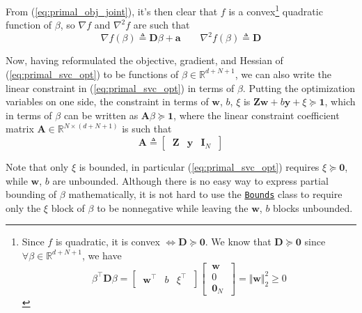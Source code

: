 \documentclass{article}
\numberwithin{equation}{section}
\newcommand{\Bounds}{%
    \href{%
        https://docs.scipy.org/doc/scipy/reference/generated/%
        scipy.optimize.Bounds.html%
    }{\texttt{Bounds}}%
}
\begin{document}
From (\ref{eq:primal_obj_joint}), it's then clear that $ f $ is a
convex\footnote{
    Since $ f $ is quadratic, it is convex $ \Leftrightarrow \mathbf{D}
    \succeq \mathbf{0} $. We know that $ \mathbf{D} \succeq \mathbf{0} $ since
    $ \forall \beta \in \mathbb{R}^{d + N + 1} $, we have
	\begin{equation*}
	    \beta^\top\mathbf{D}\beta = \begin{bmatrix}
	        \ \mathbf{w}^\top & b & \xi^\top \    
	    \end{bmatrix}\begin{bmatrix}
	        \ \mathbf{w} \ \\ \ 0 \ \\ \ \mathbf{0}_N \
	    \end{bmatrix} = \Vert\mathbf{w}\Vert_2^2 \ge 0
	\end{equation*}
} quadratic function of $ \beta $, so $ \nabla f $ and $ \nabla^2 f $ are
such that
\begin{equation} \label{eq:primal_grad_hess_joint}
    \nabla f(\beta) \triangleq \mathbf{D}\beta + \mathbf{a} \quad\quad
    \nabla^2f(\beta) \triangleq \mathbf{D}
\end{equation}

Now, having reformulated the objective, gradient, and Hessian of
(\ref{eq:primal_svc_opt}) to be functions of $ \beta \in
\mathbb{R}^{d + N + 1} $, we can also write the linear constraint in
(\ref{eq:primal_svc_opt}) in terms of $ \beta $. Putting the optimization
variables on one side, the constraint in terms of $ \mathbf{w} $, $ b $,
$ \xi $ is $ \mathbf{Zw} + b\mathbf{y} + \xi \succeq \mathbf{1} $, which in
terms of $ \beta $ can be written as $ \mathbf{A}\beta \succeq \mathbf{1} $,
where the linear constraint coefficient matrix $ \mathbf{A} \in
\mathbb{R}^{N \times (d + N + 1)} $ is such that
\begin{equation} \label{eq:primal_cons_mat_joint}
    \mathbf{A} \triangleq \begin{bmatrix}
        \ \mathbf{Z} & \mathbf{y} & \mathbf{I}_N \
    \end{bmatrix}
\end{equation}

Note that only $ \xi $ is bounded, in particular (\ref{eq:primal_svc_opt})
requires $ \xi \succeq \mathbf{0} $, while $ \mathbf{w} $, $ b $ are unbounded.
Although there is no easy way to express partial bounding of $ \beta $
mathematically, it is not hard to use the \Bounds{} class to require only the
$ \xi $ block of $ \beta $ to be nonnegative while leaving the $ \mathbf{w} $,
$ b $ blocks unbounded.
\end{document}
